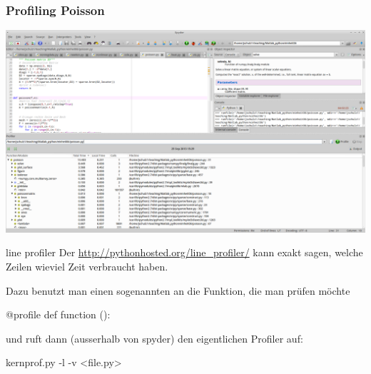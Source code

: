 \documentclass[hyperref={xetex}]{beamer}
\begin{document}
\begin{frame}[fragile]\frametitle{Profiling Poisson}
\begin{center}
\includegraphics[width=1\textwidth]{./figures/profile_poisson_py}
\end{center}
\end{frame}

\begin{frame}[fragile]{line profiler}
Der  \url{http://pythonhosted.org/line_profiler/} kann exakt sagen, welche
Zeilen wieviel Zeit verbraucht haben. 

Dazu benutzt man einen sogenannten  an die Funktion, die man prüfen möchte
\begin{pyin}
@profile
def function ():
\end{pyin}
und ruft dann (ausserhalb von spyder) den eigentlichen Profiler auf:
\begin{pyin}
kernprof.py -l -v <file.py>
\end{pyin}

\end{frame}
\end{document}
